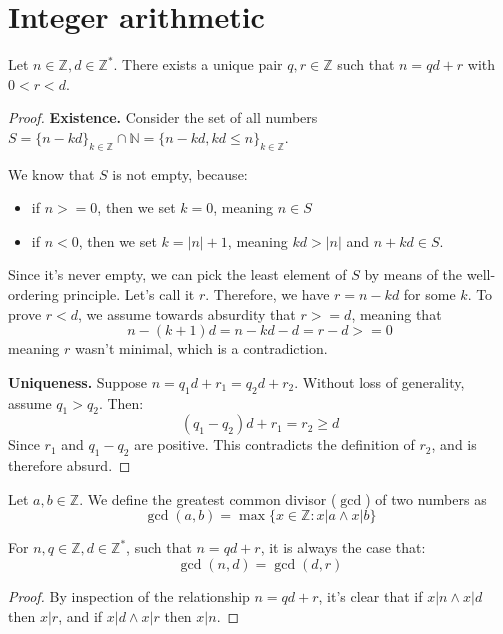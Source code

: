 \section{Integer arithmetic}

\begin{definition}
  Let $n \in \mathbb{Z}, d \in \mathbb{Z}^*$. There exists a unique pair $q, r \in \mathbb{Z}$ such that $n = qd + r$ with $0 < r < d$. 
\end{definition}
\begin{proof}
  \textbf{Existence.}
  Consider the set of all numbers $S = \{n - kd\}_{k \in \mathbb{Z}} \cap \mathbb{N} = \{n - kd, kd \leqslant n\}_{k \in \mathbb{Z}}$. 

  We know that $S$ is not empty, because: 
  \begin{itemize}
    \item if $n >= 0$, then we set $k = 0$, meaning $n \in S$
    \item if $n < 0$, then we set $k = |n| + 1$, meaning $kd > |n|$ and $n + kd \in S$.
  \end{itemize}
  Since it's never empty, we can pick the least element of $S$ by means of the well-ordering principle. Let's call it $r$. Therefore, we have $r = n - kd$ for some $k$. To prove $r < d$, we assume towards absurdity that $r >= d$, meaning that 
  \[
    n - (k + 1)d = n - kd - d = r - d >= 0
  \]
  meaning $r$ wasn't minimal, which is a contradiction.

  \textbf{Uniqueness.} Suppose $n = q_1d + r_1 = q_2d + r_2$. Without loss of generality, assume $q_1 > q_2$. Then:
  \[
    (q_1 - q_2)d + r_1 = r_2 \geqslant d
  \]
  Since $r_1$ and $q_1 - q_2$ are positive. This contradicts the definition of $r_2$, and is therefore absurd.
\end{proof}

\begin{definition}
  Let $a, b \in \mathbb{Z}$. We define the greatest common divisor ($\gcd$) of two numbers as 
  \[
    \gcd(a, b) = \max\{x \in \mathbb{Z}: x|a \land x|b\}
  \]
\end{definition}
\begin{theorem}
  For $n, q \in \mathbb{Z}, d \in \mathbb{Z}^*$, such that $n = qd + r$, it is always the case that:  
  \[ \gcd(n, d) = \gcd(d, r) \]
\end{theorem}
\begin{proof}
  By inspection of the relationship $n = qd + r$, it's clear that if $x | n \land x | d$ then $x | r$, and if $x | d \land x | r$ then $x | n$.
\end{proof}

